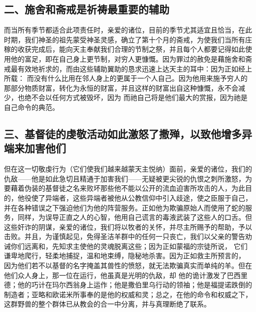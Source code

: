 
\subsection{二、施舍和斋戒是祈祷最重要的辅助}

而当所有季节都适合此项责任时，亲爱的诸位，目前的季节尤其适宜且恰当，在此时期，我们神圣的祖先蒙受神圣灵感，确立了第十个月的斋戒，为使我们当所有庄稼的收获完成后，能向天主奉献我们合理的节制之祭，并且每个人都要记得如此使用他的富足，即在自己身上更节制，对穷人更慷慨。因为罪过的赦免是藉施舍和斋戒最有效地祈求的，而由这些辅助翼助的恳求迅速上达天主的耳中：因为正如经上所载： 而没有什么比用在邻人身上的更属于一个人自己。因为他用来施予穷人的那部分物质财富，转化为永恒的财富，并且这样的财富出自这种慷慨，永不会减少，也绝不会以任何方式被毁坏，因为 而祂自己将是他们最大的赏报，因为祂是自己命令的典范。\par


\subsection{三、基督徒的虔敬活动如此激怒了撒殚，以致他增多异端来加害他们}

但在这一切敬虔行为（它们使我们越来越蒙天主悦纳）面前，亲爱的诸位，我们的仇敌——他是如此急切且精通于加害我们——无疑被更尖锐的仇恨之刺所激怒，为要藉着伪装的基督徒之名来败坏那些他不能以公开的流血迫害所攻击的人，为此目的，他役使了异端者，这些异端者被他从公教信仰中引入歧途，使之臣服于自己，并在各种错误之下强迫他们为他的阵营服务。正如他为欺骗原始人而使用了蛇的服务，同样，为误导正直之人的心智，他用自己谎言的毒液武装了这些人的口舌。但这些奸诈的阴谋，亲爱的诸位，我们将以牧者的关怀，并尽主所赐予的帮助，予以击败。并且，为谨慎起见，免得圣洁羊群中的任何一只丧亡，我们以父亲的警告劝诫你们远离和，先知求主使他的灵魂脱离这些；因为正如蒙福的宗徒所说， 它们谦卑地爬行，轻柔地捕捉，温和地束缚，隐秘地杀害。因为正如救主所预言的， 因为他们若不以基督的名字掩盖其兽性的愤怒，就无法欺骗真实而单纯的羊。但在他们众人身上，那一位在运行，他虽真是光明的仇敌，却 他的诡计激发了巴西里德；他的巧计在玛尔西翁身上运作；他是撒伯里乌行动的领袖；他是福提诺跌倒的制造者；亚略和欧诺米所事奉的是他的权威和灵；总之，在他的命令和权威之下，这群野兽的整个群体已从教会的合一中分离，并与真理断绝了联系。\par

